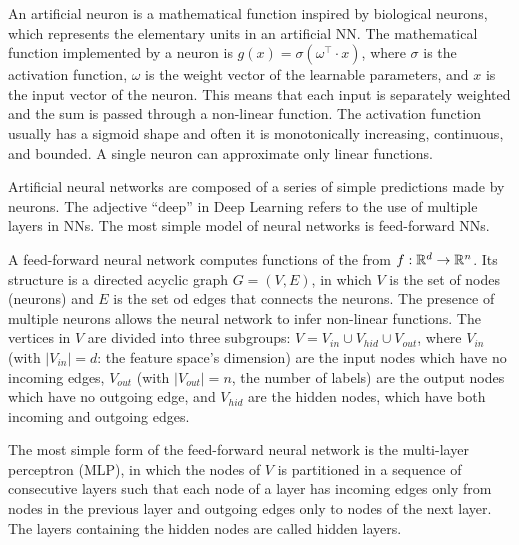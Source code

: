 \begin{definition}[Neuron]
	An artificial neuron is a mathematical function inspired by biological neurons, which represents the elementary units in an artificial NN. The mathematical function implemented by a neuron is $g(x) = \sigma(\omega^\intercal \cdot x)$, where $\sigma$ is the activation function, $\omega$ is the weight vector of the learnable parameters, and $x$ is the input vector of the neuron. This means that each input is separately weighted and the sum is passed through a non-linear function. The activation function usually has a sigmoid shape and often it is monotonically increasing, continuous, and bounded. A single neuron can approximate only linear functions.	
\end{definition}

Artificial neural networks are composed of a series of simple predictions made by neurons. The adjective ``deep'' in Deep Learning refers to the use of multiple layers in NNs. The most simple model of neural networks is feed-forward NNs. 

\begin{definition}
A feed-forward neural network computes functions of the from $f : \mathbb{R}^d \to \mathbb{R}^n$. Its structure is a directed acyclic graph $G = (V, E)$, in which $V$ is the set of nodes (neurons) and $E$ is the set od edges that connects the neurons. The presence of multiple neurons allows the neural network to infer non-linear functions. The vertices in $V$ are divided into three subgroups: $V = V_{in} \cup V_{hid} \cup V_{out}$, where $V_{in}$ (with $|V_{in}| = d$:	 the feature space's dimension) are the input nodes which have no incoming edges, $V_{out}$ (with $|V_{out}| = n$, the number of labels) are the output nodes which have no outgoing edge, and $V_{hid}$ are the hidden nodes, which have both incoming and outgoing edges.
\end{definition}

The most simple form of the feed-forward neural network is the multi-layer perceptron (MLP), in which the nodes of $V$ is partitioned in a sequence of consecutive layers such that each node of a layer has incoming edges only from
nodes in the previous layer and outgoing edges only to nodes of the next layer.  The layers containing the hidden nodes are called hidden layers. 


